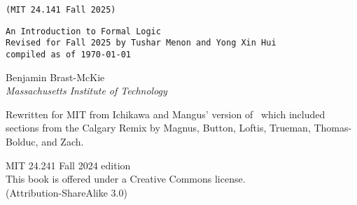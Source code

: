 
\thispagestyle{empty}
{\Huge\forallx} \hfill {\LARGE \texttt{(MIT 24.141 Fall 2025)}} %

{\tt An Introduction to Formal Logic\\
Revised for Fall 2025 by Tushar Menon and Yong Xin Hui\\ compiled as of \today}


\vspace{.5in}



{\sf Benjamin Brast-McKie}\\
\emph{Massachusetts Institute of Technology}




{\sf Rewritten for MIT from Ichikawa and Mangus' version of \forallx\ which included sections from the Calgary Remix by Magnus, Button, Loftis, Trueman, Thomas-Bolduc, and Zach.}





\vfill




{\sf
	MIT 24.241 Fall 2024 edition \\%
	This book is offered under a Creative Commons license.\\
	(Attribution-ShareAlike 3.0)
}



\newpage
\thispagestyle{empty}%


%

